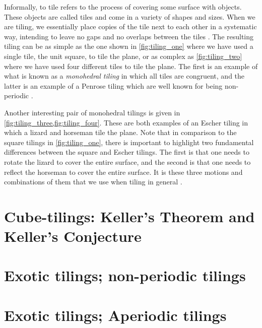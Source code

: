 \documentclass[../thesis.tex]{subfiles}
\begin{document}
Informally, to tile refers to the process of covering some surface with objects. These objects are called tiles and come in a variety of shapes and sizes. When we are tiling, we essentially place copies of the tile next to each other in a systematic way, intending to leave no gaps and no overlaps between the tiles \cite{kolountzakisTilingsTranslation2010}. The resulting tiling can be as simple as the one shown in \cref{fig:tiling_one} where we have used a single tile, the unit square, to tile the plane, or as complex as \cref{fig:tiling_two} where we have used four different tiles to tile the plane. The first is an example of what is known as a \emph{monohedral tiling} in which all tiles are congruent, and the latter is an example of a Penrose tiling which are well known for being non-periodic \cite[p. 20, 531]{grunbaumTilingsPatterns1987}. %



Another interesting pair of monohedral tilings is given in \cref{fig:tiling_three,fig:tiling_four}. These are both examples of an Escher tiling in which a lizard and horseman tile the plane. Note that in comparison to the square tilings in \cref{fig:tiling_one}, there is important to highlight two fundamental differences between the square and Escher tilings. The first is that one needs to rotate the lizard to cover the entire surface, and the second is that one needs to reflect the horseman to cover the entire surface. It is these three motions and combinations of them that we use when tiling in general \cite[p. 26]{kolountzakisTilingsTranslation2010,grunbaumTilingsPatterns1987}. 



\section{Cube-tilings: Keller's Theorem and Keller's Conjecture}
    

\section{Exotic tilings; non-periodic tilings}
    

\section{Exotic tilings; Aperiodic tilings}\label{sec:aperi_cube}
    
\clearpage
\end{document}
